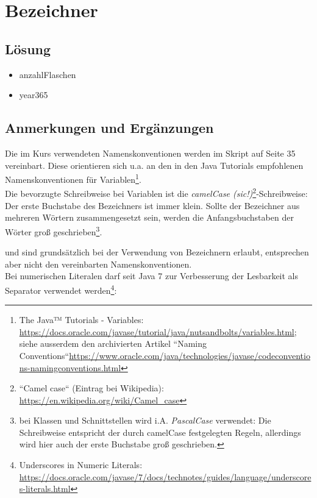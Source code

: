 \chapter{Bezeichner}

\section*{Lösung}

\begin{itemize}
    \item anzahlFlaschen
    \item year365
\end{itemize}


\section*{Anmerkungen und Ergänzungen}


Die im Kurs verwendeten Namenskonventionen werden im Skript auf Seite 35 vereinbart.
Diese orientieren sich u.a. an den in den Java Tutorials empfohlenen Namenskonventionen für Variablen\footnote{The Java™ Tutorials - Variables:
    \url{https://docs.oracle.com/javase/tutorial/java/nutsandbolts/variables.html};
    siehe ausserdem den archivierten Artikel ``Naming Conventions``\url{https://www.oracle.com/java/technologies/javase/codeconventions-namingconventions.html}
}.\\

Die bevorzugte Schreibweise bei Variablen ist die \textit{camelCase (sic!)}\footnote{``Camel case`` (Eintrag bei Wikipedia): \url{https://en.wikipedia.org/wiki/Camel_case}}-Schreibweise: Der erste
Buchstabe des Bezeichners ist immer klein.
Sollte der Bezeichner aus mehreren Wörtern zusammengesetzt sein, werden die Anfangsbuchstaben der Wörter groß
geschrieben\footnote{
    bei Klassen und Schnittstellen wird i.A. \textit{PascalCase} verwendet: Die Schreibweise entspricht der durch camelCase festgelegten Regeln, allerdings wird hier auch der erste Buchstabe groß geschrieben.
}.

\code{_} und \code{$} sind grundsätzlich bei der Verwendung von Bezeichnern erlaubt, entsprechen aber nicht
den vereinbarten Namenskonventionen.\\

Bei numerischen Literalen darf \code{_} seit Java 7 zur Verbesserung der Lesbarkeit als Separator verwendet werden\footnote{
    Underscores in Numeric Literals: \url{https://docs.oracle.com/javase/7/docs/technotes/guides/language/underscores-literals.html}
}:

